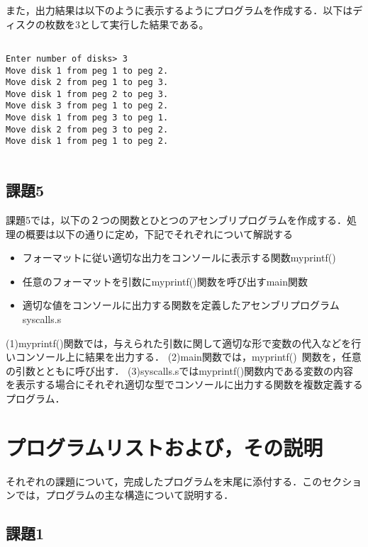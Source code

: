 \documentclass[a4j]{jarticle}
\begin{document}
また，出力結果は以下のように表示するようにプログラムを作成する．以下はディスクの枚数を3として実行した結果である。

{\baselineskip 3mm
\begin{verbatim}

Enter number of disks> 3
Move disk 1 from peg 1 to peg 2.
Move disk 2 from peg 1 to peg 3.
Move disk 1 from peg 2 to peg 3.
Move disk 3 from peg 1 to peg 2.
Move disk 1 from peg 3 to peg 1.
Move disk 2 from peg 3 to peg 2.
Move disk 1 from peg 1 to peg 2.
 
\end{verbatim}
}



\subsection{課題5}

課題5では，以下の２つの関数とひとつのアセンブリプログラムを作成する．処理の概要は以下の通りに定め，下記でそれぞれについて解説する

\begin{itemize}
\item[(1)]フォーマットに従い適切な出力をコンソールに表示する関数myprintf()
\item[(2)]任意のフォーマットを引数にmyprintf()関数を呼び出すmain関数
\item[(3)]適切な値をコンソールに出力する関数を定義したアセンブリプログラムsyscalls.s
\end{itemize}


(1)myprintf()関数では，与えられた引数に関して適切な形で変数の代入などを行いコンソール上に結果を出力する．
(2)main関数では，myprintf() 関数を，任意の引数とともに呼び出す．
(3)syscalls.sではmyprintf()関数内である変数の内容を表示する場合にそれぞれ適切な型でコンソールに出力する関数を複数定義するプログラム．



%
%

\section{プログラムリストおよび，その説明}

それぞれの課題について，完成したプログラムを末尾に添付する．このセクションでは，プログラムの主な構造について説明する．

\subsection{課題1}
\end{document}
